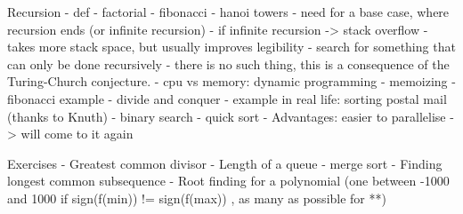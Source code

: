 Recursion
  - def
  - factorial
  - fibonacci
  - hanoi towers
  - need for a base case, where recursion ends (or infinite recursion)
    - if infinite recursion -> stack overflow
  - takes more stack space, but usually improves legibility
  - search for something that can only be done recursively
    - there is no such thing, this is a consequence of the
      Turing-Church conjecture.  
  - cpu vs memory: dynamic programming
    - memoizing
    - fibonacci example
  - divide and conquer
    - example in real life: sorting postal mail (thanks to Knuth)
    - binary search
    - quick sort
    - Advantages: easier to parallelise -> will come to it again

Exercises
  - Greatest common divisor
  - Length of a queue
  - merge sort
  - Finding longest common subsequence
  - Root finding for a polynomial (one between -1000 and 1000 if
      sign(f(min)) != sign(f(max)) , as many as possible for **)
